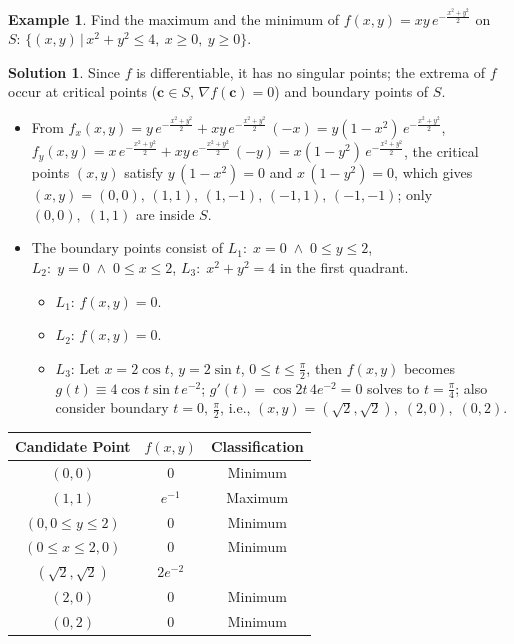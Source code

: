 \documentclass[10pt]{extarticle}
\newcommand{\ds}{\displaystyle}
\newcommand{\andd}{\;\wedge\;}
\theoremstyle{definition}
\newtheorem*{ex}{Example}
\newtheorem*{sol}{Solution}
\newcommand{\vc}{\mathbf{c}}
\begin{document}
\newpage

\begin{ex}
  Find the maximum and the minimum of $\ds f(x, y) = xy\,e^{-\frac{x^2 + y^2}{2}}$ on $\ds S:\,\big\{(x, y)\,|\,x^2 + y^2\leqslant 4,\ x\geqslant 0,\ y\geqslant 0\big\}$. 
\end{ex}

\begin{sol}
  Since $f$ is differentiable, it has no singular points; the extrema of $f$ occur at critical points ($\vc\in S,\,\nabla f(\vc) = 0$) and boundary points of $S$. 
  \begin{itemize}\setlength\itemsep{0em}
    \item From $\ds f_x(x, y) = y\,e^{-\frac{x^2 + y^2}{2}} + xy\,e^{-\frac{x^2 + y^2}{2}}\,(-x) = y(1 - x^2)\,e^{-\frac{x^2 + y^2}{2}}$, \\$\ds f_y(x, y) = x\,e^{-\frac{x^2 + y^2}{2}} + xy\,e^{-\frac{x^2 + y^2}{2}}\,(-y) = x(1 - y^2)\,e^{-\frac{x^2 + y^2}{2}}$, the critical points $(x, y)$ satisfy $\ds y\,(1 - x^2) = 0$ and $x\,(1 - y^2) = 0$, which gives $(x, y) = (0, 0),\,(1, 1),\,(1, -1),\,(-1, 1),\,(-1, -1)$; only $(0, 0),\;(1, 1)$ are inside $S$. 
    \item The boundary points consist of $L_1:\;x = 0\andd 0\leqslant y\leqslant 2$, $L_2:\;y = 0\andd 0\leqslant x\leqslant 2$, $L_3:\;x^2 + y^2 = 4$ in the first quadrant. 
      \begin{itemize}%
        \item $L_1$: $f(x, y) = 0$. 
        \item $L_2$: $f(x, y) = 0$. 
        \item $L_3$: Let $x = 2\cos t$, $y = 2\sin t$, $0\leqslant t\leqslant\frac{\pi}{2}$, then $f(x, y)$ becomes $\ds g(t)\equiv4\cos t\sin t\,e^{-2}$; $g'(t) = \cos 2t\,4e^{-2} = 0$ solves to $t = \frac{\pi}{4}$; also consider boundary $t = 0,\,\frac{\pi}{2}$, i.e., $(x, y) = (\sqrt{2}, \sqrt{2}),\;(2, 0),\;(0, 2)$.  
      \end{itemize}
  \end{itemize}
  \begin{center}
    \begin{tabular}{ccc}
      \toprule
      Candidate Point  & $f(x,y)$ & Classification \\ 
      \midrule
      $(0, 0)$ & $0$ & Minimum \\ 
      $(1, 1)$ & $e^{-1}$ & Maximum \\ 
      $(0, 0\leqslant y\leqslant 2)$ & $0$ & Minimum \\
      $(0\leqslant x\leqslant 2, 0)$ & $0$ & Minimum \\
      $(\sqrt{2}, \sqrt{2})$ & $2e^{-2}$ & \\ 
      $(2, 0)$ & $0$ & Minimum \\ 
      $(0, 2)$ & $0$ & Minimum \\ 
      \bottomrule
    \end{tabular}
  \end{center}
\end{sol}
\end{document}
